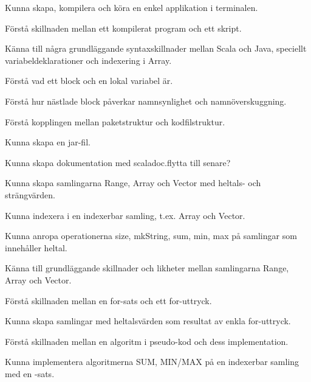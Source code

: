 
\item Kunna skapa, kompilera och köra en enkel applikation i terminalen.
\item Förstå skillnaden mellan ett kompilerat program och ett skript.
\item Känna till några grundläggande syntaxskillnader mellan Scala och Java, speciellt variabeldeklarationer och indexering i Array.
\item Förstå vad ett block och en lokal variabel är.
\item Förstå hur nästlade block påverkar namnsynlighet och namnöverskuggning.
\item Förstå kopplingen mellan paketstruktur och kodfilstruktur.
\item Kunna skapa en jar-fil.
\item Kunna skapa dokumentation med scaladoc.\TODO flytta till senare?
\item Kunna skapa samlingarna Range, Array och Vector med heltals- och strängvärden.
\item Kunna indexera i en indexerbar samling, t.ex. Array och Vector.
\item Kunna anropa operationerna size, mkString, sum, min, max på samlingar som innehåller heltal.
\item Känna till grundläggande skillnader och likheter mellan samlingarna Range, Array och Vector.
\item Förstå skillnaden mellan en for-sats och ett for-uttryck.
\item Kunna skapa samlingar med heltalsvärden som resultat av enkla for-uttryck.
\item Förstå skillnaden mellan en algoritm i pseudo-kod och dess implementation.
\item Kunna implementera algoritmerna SUM, MIN/MAX på en indexerbar samling med en -sats.
